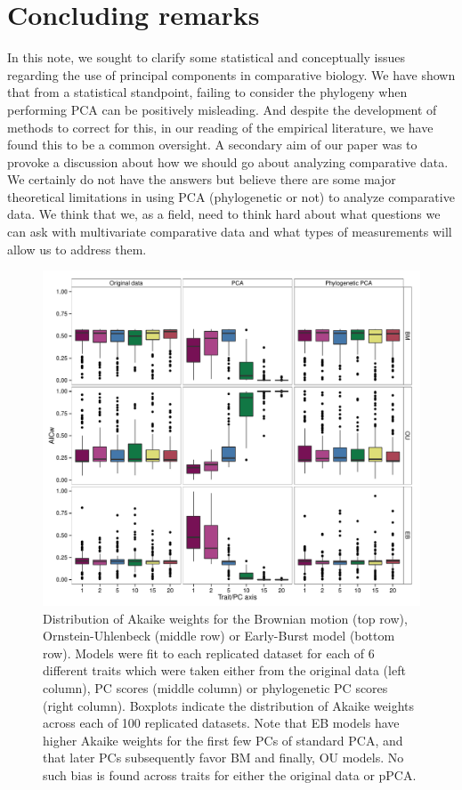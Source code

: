 \documentclass[a4paper,12pt]{article}
\begin{document}
\section{Concluding remarks}
In this note, we sought to clarify some statistical and conceptually issues regarding the use of principal components in comparative biology. We have shown that from a statistical standpoint, failing to consider the phylogeny when performing PCA can be positively misleading. And despite the development of methods to correct for this, in our reading of the empirical literature, we have found this to be a common oversight. A secondary aim of our paper was to provoke a discussion about how we should go about analyzing comparative data. We certainly do not have the answers but believe there are some major theoretical limitations in using PCA (phylogenetic or not) to analyze comparative data. We think that we, as a field, need to think hard about what questions we can ask with multivariate comparative data and what types of measurements will allow us to address them.

\begin{figure}[p]
\centering
\includegraphics[scale=0.5]{./fig/box-aicw-corbm.pdf}
\caption{Distribution of Akaike weights for the Brownian motion (top row), Ornstein-Uhlenbeck (middle row) or Early-Burst model (bottom row). Models were fit to each replicated dataset for each of 6 different traits which were taken either from the original data (left column), PC scores (middle column) or phylogenetic PC scores (right column). Boxplots indicate the distribution of Akaike weights across each of 100 replicated datasets. Note that EB models have higher Akaike weights for the first few PCs of standard PCA, and that later PCs subsequently favor BM and finally, OU models. No such bias is found across traits for either the original data or pPCA.}
\label{corbm}
\end{figure}
\end{document}
